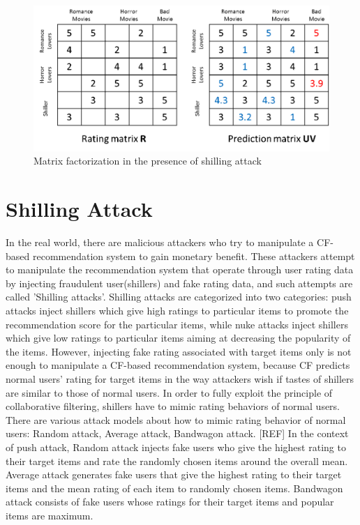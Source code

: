 \documentclass[master,english,final]{kaist-ucs}
\begin{document}
\begin{figure}[t]
    \centerline{\includegraphics[width=12.5cm]{figure/mf_attacked}}
    \caption{  Matrix factorization in the presence of shilling attack   } \label{mf_attacked}
\end{figure}


\section{Shilling Attack}
In the real world, there are malicious attackers who try to manipulate a CF-based recommendation system to gain monetary benefit.
These attackers attempt to manipulate the recommendation system that operate through user rating data by injecting fraudulent user(shillers) and fake rating data, and such attempts are called 'Shilling attacks'.
Shilling attacks are categorized into two categories: push attacks inject shillers which give high ratings to particular items to promote the recommendation score for the particular items, while nuke attacks inject shillers which give low ratings to particular items aiming at decreasing the popularity of the items.
However, injecting fake rating associated with target items only is not enough to manipulate a CF-based recommendation system, because CF predicts normal users' rating for target items in the way attackers wish if tastes of shillers are similar to those of normal users.
In order to fully exploit the principle of collaborative filtering, shillers have to mimic rating behaviors of normal users.
There are various attack models about how to mimic rating behavior of normal users: Random attack, Average attack, Bandwagon attack. [REF]
In the context of push attack, Random attack injects fake users who give the highest rating to their target items and rate the randomly chosen items around the overall mean.
Average attack generates fake users that give the highest rating to their target items and the mean rating of each item to randomly chosen items.
Bandwagon attack consists of fake users whose ratings for their target items and popular items are maximum.
\end{document}
